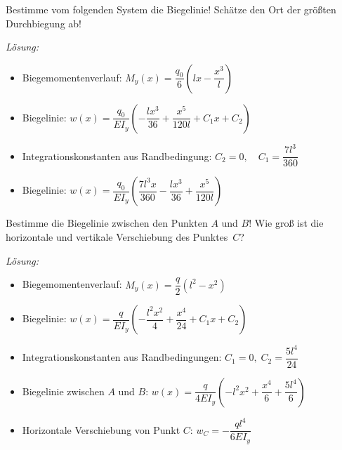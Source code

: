 \begin{example}
	Bestimme vom folgenden System die Biegelinie!
	Schätze den Ort der größten Durchbiegung ab!
	\begin{center}
		
	\end{center}
	
	\textit{Lösung:}
	\begin{itemize}
		\item Biegemomentenverlauf: $M_y(x) = \dfrac{q_0}{6}\left(lx-\dfrac{x^3}{l}\right)$
		\item Biegelinie: $w(x) = \dfrac{q_0}{EI_y}\left(-\dfrac{lx^3}{36}+\dfrac{x^5}{120l}+C_1x + C_2\right)$
		\item Integrationskonstanten aus Randbedingung: $C_2=0,\quad C_1=\dfrac{7l^3}{360}$
		\item Biegelinie: $w(x) = \dfrac{q_0}{EI_y}\left(\dfrac{7l^3x}{360}-\dfrac{lx^3}{36}+\dfrac{x^5}{120l}\right)$
	\end{itemize}
	
\end{example}

\begin{example}
	Bestimme die Biegelinie zwischen den Punkten $A$ und $B$!
	Wie groß ist die horizontale und vertikale Verschiebung des Punktes~$C$?
	\begin{center}
		
	\end{center}
	
	\textit{Lösung:}
	\begin{itemize}
		\item Biegemomentenverlauf: $M_y(x)=\dfrac{q}{2}(l^2-x^2)$
		\item Biegelinie: $w(x) = \dfrac{q}{EI_y}\left(-\dfrac{l^2x^2}{4}+\dfrac{x^4}{24}+C_1x+C_2\right)$
		\item Integrationskonstanten aus Randbedingungen: $C_1=0,\;C_2=\dfrac{5l^4}{24}$
		\item Biegelinie zwischen $A$ und $B$: $w(x) = \dfrac{q}{4EI_y}\left(-l^2x^2+\dfrac{x^4}{6}+\dfrac{5l^4}{6}\right)$
		\item Horizontale Verschiebung von Punkt $C$: $w_{C} = -\dfrac{ql^4}{6EI_y}$ 
	\end{itemize}

\end{example} 

